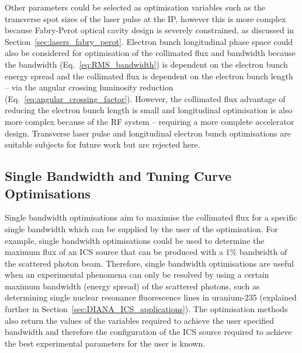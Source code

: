 \documentclass[../main.tex]{subfiles}
\begin{document}
Other parameters could be selected as optimisation variables such as the transverse spot sizes of the laser pulse at the IP, however this is more complex because Fabry-Perot optical cavity design is severely constrained, as discussed in Section~\ref{sec:lasers_fabry_perot}. Electron bunch longitudinal phase space could also be considered for optimisation of the collimated flux and bandwidth because the bandwidth (Eq.~\ref{eq:RMS_bandwidth}) is dependent on the electron bunch energy spread and the collimated flux is dependent on the electron bunch length -- via the angular crossing luminosity reduction (Eq.~\ref{eq:angular_crossing_factor}). However, the collimated flux advantage of reducing the electron bunch length is small and longitudinal optimisation is also more complex because of the RF system -- requiring a more complete accelerator design. Transverse laser pulse and longitudinal electron bunch optimisations are suitable subjects for future work but are rejected here.  

\subsection{Single Bandwidth and Tuning Curve Optimisations}

Single bandwidth optimisations aim to maximise the collimated flux for a specific single bandwidth which can be supplied by the user of the optimisation. For example, single bandwidth optimisations could be used to determine the maximum flux of an ICS source that can be produced with a 1\% bandwidth of the scattered photon beam. Therefore, single bandwidth optimisations are useful when an experimental phenomena can only be resolved by using a certain maximum bandwidth (energy spread) of the scattered photons, such as determining single nuclear resonance fluorescence lines in uranium-235 \cite{hayakawa2010nondestructive} (explained further in Section~\ref{sec:DIANA_ICS_applications}). The optimisation methods also return the values of the variables required to achieve the user specified bandwidth and therefore the configuration of the ICS source required to achieve the best experimental parameters for the user is known.
\end{document}
